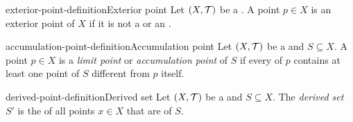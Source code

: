 \documentclass[preview]{standalone}
\begin{document}

\begin{snippetdefinition}{exterior-point-definition}{Exterior point}
    Let \({(X, \mathcal{T})}\) be a \topologicalspace.
    A point \(p \in X\) is an exterior point of \(X\) if it is not a \boundarypoint
    or an \interiorpoint.
\end{snippetdefinition}

\begin{snippetdefinition}{accumulation-point-definition}{Accumulation point}
    Let \({(X, \mathcal{T})}\) be a \topologicalspace and \(S \subseteq X\).
    A point \(p \in X\) is a \textit{limit point} or \textit{accumulation point} of \(S\)
    if every \neighborhood of \(p\) contains at least one point of \(S\) different from \(p\) itself.
\end{snippetdefinition}

\begin{snippetdefinition}{derived-point-definition}{Derived set}
    Let \({(X, \mathcal{T})}\) be a \topologicalspace and \(S \subseteq X\).
    The \textit{derived set} \(S'\) is the \set of all points \(x\in X\) that are
     of \(S\).
\end{snippetdefinition}
\end{document}
